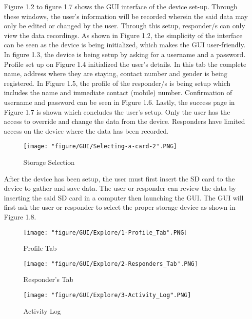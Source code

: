 Figure 1.2 to figure 1.7 shows the GUI interface of the device set-up. Through these windows, the user’s information will be recorded wherein the said data may only be edited or changed by the user. Through this setup, responder/s can only view the data recordings. As shown in Figure 1.2, the simplicity of the interface can be seen as the device is being initialized, which makes the GUI user-friendly. In figure 1.3, the device is being setup by asking for a username and a password. Profile set up on Figure 1.4 initialized the user’s details. In this tab the complete name, address where they are staying, contact number and gender is being registered. In Figure 1.5, the profile of the responder/s is being setup which includes the name and immediate contact (mobile) number. Confirmation of username and password can be seen in Figure 1.6. Lastly, the success page in Figure 1.7 is shown which concludes the user’s setup. Only the user has the access to override and change the data from the device. Responders have limited access on the device where the data has been recorded. 

\begin{figure}[htbp]
	\centering
		\texttt{[image: "figure/GUI/Selecting-a-card-2".PNG]}
	\caption{Storage Selection}
	\label{fig:Selecting-a-card-2}
\end{figure}

After the device has been setup, the user must first insert the SD card to the device to gather and save data. The user or responder can review the data by inserting the said SD card in a computer then launching the GUI. The GUI will first ask the user or responder to select the proper storage device as shown in Figure 1.8.

\begin{figure}[htbp]
	\centering
		\texttt{[image: "figure/GUI/Explore/1-Profile\_Tab".PNG]}
	\caption{Profile Tab}
	\label{fig:1-Profile_Tab}
\end{figure}

\begin{figure}[htbp]
	\centering
		\texttt{[image: "figure/GUI/Explore/2-Responders\_Tab".PNG]}
	\caption{Responder's Tab}
	\label{fig:2-Responders_Tab}
\end{figure}

\begin{figure}[htbp]
	\centering
		\texttt{[image: "figure/GUI/Explore/3-Activity\_Log".PNG]}
	\caption{Activity Log}
	\label{fig:3-Activity_Log}
\end{figure}

